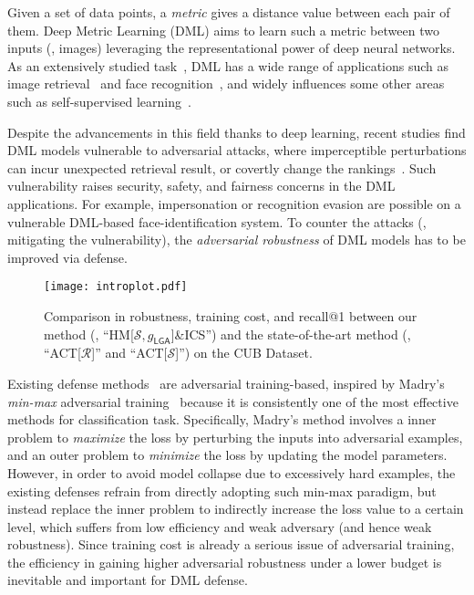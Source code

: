 \documentclass[10pt,twocolumn,letterpaper]{article}
\begin{document}

Given a set of data points, a \emph{metric} gives a distance value between each
pair of them.
%
Deep Metric Learning (DML) aims to learn such a metric between two inputs (\eg,
images) leveraging the representational power of deep neural networks.
%
As an extensively studied task~\cite{revisiting,dmlreality}, DML has a wide
range of applications such as image retrieval~\cite{imagesim2} and face
recognition~\cite{facenet,domainface}, and widely influences some other areas
such as self-supervised learning~\cite{dmlreality}.

Despite the advancements in this field thanks to deep learning, recent studies
find DML models vulnerable to adversarial attacks, where  imperceptible
perturbations can incur unexpected retrieval result, or covertly change the
rankings~\cite{advrank,advorder}.
%
Such vulnerability raises security, safety, and fairness concerns in the DML
applications.
%
For example, impersonation or recognition evasion are possible on a vulnerable
DML-based face-identification system.
%
To counter the attacks (\ie, mitigating the vulnerability), the
\emph{adversarial robustness} of DML models has to be improved via defense.

\begin{figure}[t]
	\texttt{[image: introplot.pdf]}
	\caption{
		Comparison in robustness, training cost, and recall@1 
		between our method (\ie, ``HM[$\mathcal{S},g_\mathsf{LGA}$]\&ICS'')
		and the state-of-the-art method (\ie, ``ACT[$\mathcal{R}$]'' and
		``ACT[$\mathcal{S}$]'') on the CUB Dataset.
	}
	\label{fig:introplot}
\end{figure}


Existing defense methods~\cite{advrank,robrank} are adversarial training-based,
inspired by Madry's \emph{min-max} adversarial training~\cite{madry} because it
is consistently one of the most effective methods for classification task.
%
Specifically, Madry's method involves a inner problem to \emph{maximize} the
loss by perturbing the inputs into adversarial examples, and an outer problem
to \emph{minimize} the loss by updating the model parameters.
%
However, in order to avoid model collapse due to excessively hard examples, the
existing defenses refrain from directly adopting such min-max paradigm, but
instead replace the inner problem to indirectly increase the loss value to a
certain level, which suffers from low efficiency and weak adversary (and hence
weak robustness).
%
Since training cost is already a serious issue of adversarial training, the
efficiency in gaining higher adversarial robustness under a lower budget is
inevitable and important for DML defense.
\end{document}
